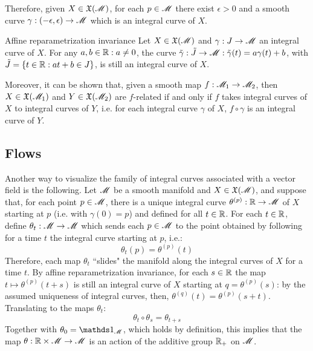 Therefore, given $ X \in \mathfrak{X}(\mathscr{M}) $, for each $ p \in \mathscr{M} $ there exist $ \epsilon > 0 $ and a smooth curve $ \gamma : (-\epsilon , \epsilon) \rightarrow \mathscr{M} $ which is an integral curve of $ X $.

\begin{proposition}{Affine reparametrization invariance}{}
  Let $ X \in \mathfrak{X}(\mathscr{M}) $ and $ \gamma : J \rightarrow \mathscr{M} $ an integral curve of $ X $. For any $ a,b \in \mathbb{R} : a \neq 0 $, the curve $ \tilde{\gamma} : \tilde{J} \rightarrow \mathscr{M} : \tilde{\gamma}(t) = a \gamma(t) + b $, with $ \tilde{J} = \{t \in \mathbb{R} : at + b \in J\} $, is still an integral curve of $ X $.
\end{proposition}

Moreover, it can be shown that, given a smooth map $ f : \mathscr{M}_1 \rightarrow \mathscr{M}_2 $, then $ X \in \mathfrak{X}(\mathscr{M}_1) $ and $ Y \in \mathfrak{X}(\mathscr{M}_2) $ are $ f $-related if and only if $ f $ takes integral curves of $ X $ to integral curves of $ Y $, i.e. for each integral curve $ \gamma $ of $ X $, $ f \circ \gamma $ is an integral curve of $ Y $.

\subsection{Flows}

Another way to visualize the family of integral curves associated with a vector field is the following. Let $ \mathscr{M} $ be a smooth manifold and $ X \in \mathfrak{X}(\mathscr{M}) $, and suppose that, for each point $ p \in \mathscr{M} $, there is a unique integral curve $ \theta^{(p)} : \mathbb{R} \rightarrow \mathscr{M} $ of $ X $ starting at $ p $ (i.e. with $ \gamma(0) = p $) and defined for all $ t \in \mathbb{R} $. For each $ t \in \mathbb{R} $, define $ \theta_t : \mathscr{M} \rightarrow \mathscr{M} $ which sends each $ p \in \mathscr{M} $ to the point obtained by following for a time $ t $ the integral curve starting at $ p $, i.e.:
\begin{equation*}
  \theta_t(p) = \theta^{(p)}(t)
\end{equation*}
Therefore, each map $ \theta_t $ ``slides" the manifold along the integral curves of $ X $ for a time $ t $. By affine reparametrization invariance, for each $ s \in \mathbb{R} $ the map $ t \mapsto \theta^{(p)}(t + s) $ is still an integral curve of $ X $ starting at $ q = \theta^{(p)}(s) $: by the assumed uniqueness of integral curves, then, $ \theta^{(q)}(t) = \theta^{(p)}(s + t) $. Translating to the maps $ \theta_t $:
\begin{equation*}
  \theta_t \circ \theta_s = \theta_{t + s}
\end{equation*}
Together with $ \theta_0 = \id_\man $, which holds by definition, this implies that the map $ \theta : \mathbb{R} \times \mathscr{M} \rightarrow \mathscr{M} $ is an action of the additive group $ \mathbb{R}_+ $ on $ \mathscr{M} $.

